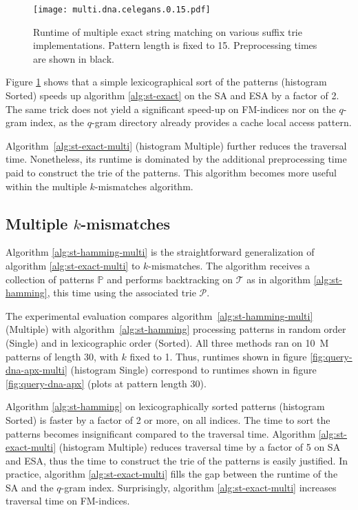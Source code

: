 \begin{figure}[b]
\begin{center}
\caption[Multiple exact string matching runtime]{Runtime of multiple exact string matching on various suffix trie implementations. Pattern length is fixed to 15. Preprocessing times are shown in black.}
\label{fig:query-dna-exact-multi}
\texttt{[image: multi.dna.celegans.0.15.pdf]}
\end{center}
\end{figure}

Figure \ref{fig:query-dna-exact-multi} shows that a simple lexicographical sort of the patterns (histogram Sorted) speeds up algorithm \ref{alg:st-exact} on the SA and ESA by a factor of 2.
The same trick does not yield a significant speed-up on FM-indices nor on the $q$-gram index, as the $q$-gram directory already provides a cache local access pattern.

Algorithm~\ref{alg:st-exact-multi} (histogram Multiple) further reduces the traversal time.
Nonetheless, its runtime is dominated by the additional preprocessing time paid to construct the trie of the patterns.
This algorithm becomes more useful within the multiple $k$-mismatches algorithm.

\subsection{Multiple $k$-mismatches}
\label{sec:index:algo:multimismatch}

Algorithm \ref{alg:st-hamming-multi} is the straightforward generalization of algorithm \ref{alg:st-exact-multi} to $k$-mismatches.
The algorithm receives a collection of patterns $\mathbb{P}$ and performs backtracking on $\mathcal{T}$ as in algorithm  \ref{alg:st-hamming}, this time using the associated trie $\mathcal{P}$.

The experimental evaluation compares algorithm~\ref{alg:st-hamming-multi} (Multiple) with algorithm~\ref{alg:st-hamming} processing patterns in random order (Single) and in lexicographic order (Sorted).
All three methods ran on 10~M patterns of length 30, with $k$ fixed to 1.
Thus, runtimes shown in figure \ref{fig:query-dna-apx-multi} (histogram Single) correspond to runtimes shown in figure \ref{fig:query-dna-apx} (plots at pattern length 30).

Algorithm \ref{alg:st-hamming} on lexicographically sorted patterns (histogram Sorted) is faster by a factor of 2 or more, on all indices.
The time to sort the patterns becomes insignificant compared to the traversal time.
Algorithm \ref{alg:st-exact-multi} (histogram Multiple) reduces traversal time by a factor of 5 on SA and ESA, thus the time to construct the trie of the patterns is easily justified.
In practice, algorithm \ref{alg:st-exact-multi} fills the gap between the runtime of the SA and the $q$-gram index.
Surprisingly, algorithm \ref{alg:st-exact-multi} increases traversal time on FM-indices.


